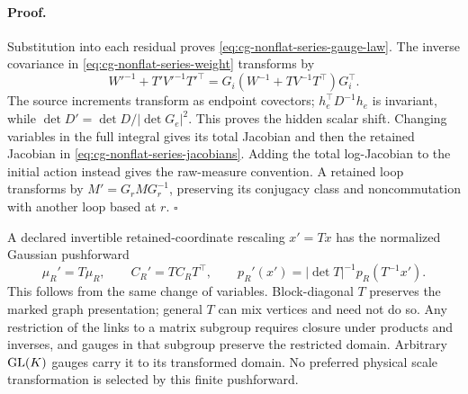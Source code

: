 \paragraph{Proof.}
Substitution into each residual proves
\eqref{eq:cg-nonflat-series-gauge-law}.
The inverse covariance in \eqref{eq:cg-nonflat-series-weight}
transforms by
\begin{equation}
W'^{-1}+T'V'^{-1}T'^\top
=G_i(W^{-1}+TV^{-1}T^\top)G_i^\top.
\label{eq:cg-nonflat-series-covariance-gauge}
\end{equation}
The source increments transform as endpoint covectors;
\(h_e^\top D^{-1}h_e\) is invariant, while
\(\det D'=\det D/|\det G_e|^2\).
This proves the hidden scalar shift. Changing variables in the
full integral gives its total Jacobian and then the retained
Jacobian in \eqref{eq:cg-nonflat-series-jacobians}. Adding the
total log-Jacobian to the initial action instead gives the
raw-measure convention. A retained loop transforms by
\(M'=G_rMG_r^{-1}\), preserving its conjugacy class and
noncommutation with another loop based at \(r\). \(\square\)

A declared invertible retained-coordinate rescaling \(x'=Tx\) has
the normalized Gaussian pushforward
\begin{equation}
\mu_R'=T\mu_R,\qquad C_R'=TC_RT^\top,\qquad
p_R'(x')=|\det T|^{-1}p_R(T^{-1}x').
\label{eq:cg-nonflat-series-rescaling}
\end{equation}
This follows from the same change of variables. Block-diagonal
\(T\) preserves the marked graph presentation; general \(T\)
can mix vertices and need not do so. Any restriction of the links
to a matrix subgroup requires closure under products and inverses,
and gauges in that subgroup preserve the restricted domain.
Arbitrary \(\mathrm{GL}(K)\) gauges carry it to its transformed domain.
No preferred physical scale transformation is selected by this
finite pushforward. 

